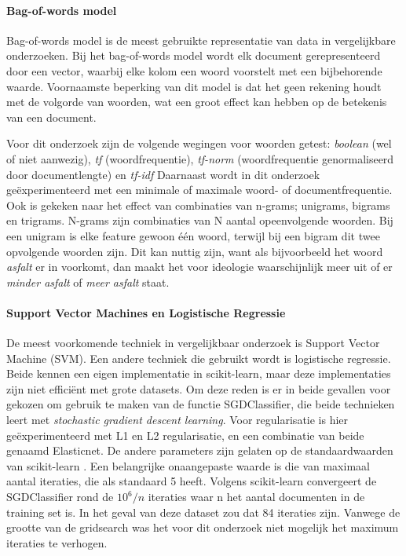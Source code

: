 \paragraph{Bag-of-words model}
Bag-of-words model is de meest gebruikte representatie van data in vergelijkbare onderzoeken. Bij het bag-of-words model wordt elk document gerepresenteerd door een vector, waarbij elke kolom een woord voorstelt met een bijbehorende waarde. Voornaamste beperking van dit model is dat het geen rekening houdt met de volgorde van woorden, wat een groot effect kan hebben op de betekenis van een document.\par
Voor dit onderzoek zijn de volgende wegingen voor woorden getest: \textit{boolean} (wel of niet aanwezig), \textit{tf} (woordfrequentie), \textit{tf-norm} (woordfrequentie genormaliseerd door documentlengte) en \textit{tf-idf}
Daarnaast wordt in dit onderzoek geëxperimenteerd met een minimale of maximale woord- of documentfrequentie. Ook is gekeken naar het effect van combinaties van n-grams; unigrams, bigrams en trigrams. N-grams zijn combinaties van N aantal opeenvolgende woorden. Bij een unigram is elke feature gewoon één woord, terwijl bij een bigram dit twee opvolgende woorden zijn. Dit kan nuttig zijn, want als bijvoorbeeld het woord \textit{asfalt} er in voorkomt, dan maakt het voor ideologie waarschijnlijk meer uit of er \textit{minder asfalt} of \textit{meer asfalt} staat.\par

\paragraph{Support Vector Machines en Logistische Regressie}
De meest voorkomende techniek in vergelijkbaar onderzoek is Support Vector Machine (SVM). Een andere techniek die gebruikt wordt is logistische regressie. Beide kennen een eigen implementatie in scikit-learn, maar deze implementaties zijn niet efficiënt met grote datasets. Om deze reden is er in beide gevallen voor gekozen om gebruik te maken van de functie SGDClassifier, die beide technieken leert met \textit{stochastic gradient descent learning}. Voor regularisatie is hier geëxperimenteerd met L1 en L2 regularisatie, en een combinatie van beide genaamd Elasticnet. De andere parameters zijn gelaten op de standaardwaarden van scikit-learn \cite{scikit-learn}. Een belangrijke onaangepaste waarde is die van maximaal aantal iteraties, die als standaard 5 heeft. Volgens scikit-learn convergeert de SGDClassifier rond de $10^{6}/n$ iteraties waar n het aantal documenten in de training set is. In het geval van deze dataset zou dat 84 iteraties zijn. Vanwege de grootte van de gridsearch was het voor dit onderzoek niet mogelijk het maximum iteraties te verhogen.\par

